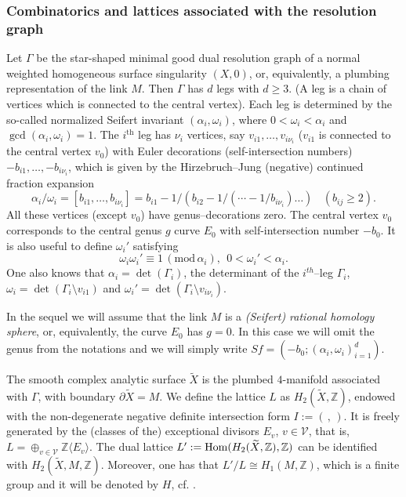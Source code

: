 \documentclass[oneside]{amsart}
\numberwithin{equation}{section}
\numberwithin{equation}{subsection}
\theoremstyle{plain}
\theoremstyle{definition}
\DeclareMathOperator{\Hom}{{\rm Hom}}
\def\Z{\mathbb Z}
\newcommand{\calv}{{\mathcal V}}
\renewcommand{\Z}{\mathbb{Z}}
\begin{document}
\subsubsection{\bf Combinatorics and lattices associated with the resolution graph}\label{ss:seifert}

Let $\Gamma$ be the star-shaped minimal good dual resolution graph of a   normal weighted homogeneous surface singularity $(X,0)$, or, equivalently, a plumbing representation of the link $M$. Then $\Gamma$ has $d$ legs with $d\geq 3$. (A leg is a chain of vertices which is connected to the central vertex). Each leg is determined by the so-called normalized Seifert invariant $(\alpha_i,\omega_i)$,
where $0<\omega_i <\alpha_i$ and $\gcd(\alpha_i,\omega_i)=1$. The $i^{\mathrm{th}}$ leg has $\nu_i$ vertices, say $v_{i1},\ldots, v_{i\nu_i}$ ($v_{i1}$ is connected to the central vertex $v_0$)
with Euler decorations (self-intersection numbers)
$-b_{i1},\ldots, -b_{i\nu_i}$, which is given by the Hirzebruch--Jung (negative) continued fraction expansion
$$ \alpha_i/\omega_i=[b_{i1},\ldots, b_{i\nu_i}]=
b_{i1}-1/(b_{i2}-1/(\cdots -1/b_{i\nu_i})\dots) \ \  \ \ (b_{ij}\geq 2).$$
All these vertices (except $v_0$) have genus--decorations zero. The central vertex $v_0$ corresponds to the central genus $g$ curve $E_0$ with self-intersection number $-b_0$.
It is also useful to define $\omega_i'$ satisfying 
\begin{equation}\label{eq:w'}
\omega_i\omega_i'\equiv 1 \, (\mathrm{mod} \,\alpha_i), \ \ 0< \omega_i'<\alpha_i.
\end{equation}
One also knows that  $\alpha_i=\det(\Gamma_i)$, the determinant of the $i^{th}$--leg $\Gamma_i$, $\omega_i=\det(\Gamma_i\setminus v_{i1})$ and  $\omega_i'=\det(\Gamma_i\setminus v_{i\nu_i})$.

In the sequel we will assume that the link $M$ is a {\em (Seifert) rational homology sphere}, or, equivalently, the curve $E_0$ has $g=0$. In this case we will omit the genus from the notations and we will simply write $Sf=(-b_0;(\alpha_i,\omega_i)_{i=1}^d)$. 

The smooth complex analytic surface $\widetilde X$ is the plumbed $4$-manifold associated with $\Gamma$, with boundary $\partial \widetilde{X} = M$. 
We define the lattice $L$ as $H_2(\tilde X,\Z)$, endowed with the non-degenerate negative definite intersection form $I:=(\, , \,)$. It is freely generated by the (classes of the) exceptional divisors $E_v$, $v\in \calv$, that is,
$L=\oplus_{v\in \calv} \Z\langle E_v \rangle$. The dual lattice $L':= \Hom(H_2(\widetilde X,\Z),\Z)$ can be identified with $H_2(\widetilde{X}, M, \Z)$. Moreover, one has that $L'/L\cong H_1(M,\Z)$, which is a finite group and it will be denoted by $H$, cf. \cite{Nfive,nembook}.
\end{document}
